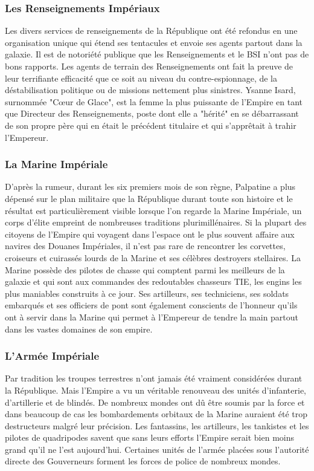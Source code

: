 \documentclass[twoside]{article}
\begin{document}
\subsubsection{Les Renseignements Impériaux}
Les divers services de renseignements de la République ont été refondus en une organisation unique qui étend ses tentacules et envoie ses agents partout dans la galaxie. Il est de notoriété publique que les Renseignements et le BSI n'ont pas de bons rapports. Les agents de terrain des Renseignements ont fait la preuve de leur terrifiante efficacité que ce soit au niveau du contre-espionnage, de la déstabilisation politique ou de missions nettement plus sinistres. Ysanne Isard, surnommée "C\oe ur de Glace", est la femme la plus puissante de l'Empire en tant que Directeur des Renseignements, poste dont elle a "hérité" en se débarrassant de son propre père qui en était le précédent titulaire et qui s'apprêtait à trahir l'Empereur.

\subsubsection{La Marine Impériale}
D'après la rumeur, durant les six premiers mois de son règne, Palpatine a plus dépensé sur le plan militaire que la République durant toute son histoire et le résultat est particulièrement visible lorsque l'on regarde la Marine Impériale, un corps d'élite empreint de nombreuses traditions plurimillénaires. Si la plupart des citoyens de l'Empire qui voyagent dans l'espace ont le plus souvent affaire aux navires des Douanes Impériales, il n'est pas rare de rencontrer les corvettes, croiseurs et cuirassés lourds de la Marine et ses célèbres destroyers stellaires. La Marine possède des pilotes de chasse qui comptent parmi les meilleurs de la galaxie et qui sont aux commandes des redoutables chasseurs TIE, les engins les plus maniables construits à ce jour. Ses artilleurs, ses techniciens, ses soldats embarqués et ses officiers de pont sont également conscients de l'honneur qu'ils ont à servir dans la Marine qui  permet à l'Empereur de tendre la main partout dans les vastes domaines de son empire.

\subsubsection{L'Armée Impériale}
Par tradition les troupes terrestres n'ont jamais été vraiment considérées durant la République. Mais l'Empire a vu un véritable renouveau des unités d'infanterie, d'artillerie et de blindés. De nombreux mondes ont dû être soumis par la force et dans beaucoup de cas les bombardements orbitaux de la Marine auraient été trop destructeurs malgré leur précision. Les fantassins, les artilleurs, les tankistes et les pilotes de quadripodes savent que sans leurs efforts l'Empire serait bien moins grand qu'il ne l'est aujourd'hui. Certaines unités de l'armée placées sous l'autorité directe des Gouverneurs forment les forces de police de nombreux mondes.
\end{document}
